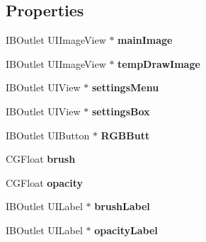 \subsection*{Properties}
\begin{DoxyCompactItemize}
\item 
\hypertarget{interface_draw_view_controller_ab6e98cda7ec75937c828a67591a1ed9c}{I\-B\-Outlet U\-I\-Image\-View $\ast$ {\bfseries main\-Image}}\label{interface_draw_view_controller_ab6e98cda7ec75937c828a67591a1ed9c}

\item 
\hypertarget{interface_draw_view_controller_a8d0bf1230597b17343797f0d998e7f25}{I\-B\-Outlet U\-I\-Image\-View $\ast$ {\bfseries temp\-Draw\-Image}}\label{interface_draw_view_controller_a8d0bf1230597b17343797f0d998e7f25}

\item 
\hypertarget{interface_draw_view_controller_a5d6a24c06d2078e27736d201076f61a4}{I\-B\-Outlet U\-I\-View $\ast$ {\bfseries settings\-Menu}}\label{interface_draw_view_controller_a5d6a24c06d2078e27736d201076f61a4}

\item 
\hypertarget{interface_draw_view_controller_af6a76a7906604ebf86e9e76488f05301}{I\-B\-Outlet U\-I\-View $\ast$ {\bfseries settings\-Box}}\label{interface_draw_view_controller_af6a76a7906604ebf86e9e76488f05301}

\item 
\hypertarget{interface_draw_view_controller_a4faa64d6fc92e03208f0dc111127f29d}{I\-B\-Outlet U\-I\-Button $\ast$ {\bfseries R\-G\-B\-Butt}}\label{interface_draw_view_controller_a4faa64d6fc92e03208f0dc111127f29d}

\item 
\hypertarget{interface_draw_view_controller_a439c6436002d7aae469bb57ef3093790}{C\-G\-Float {\bfseries brush}}\label{interface_draw_view_controller_a439c6436002d7aae469bb57ef3093790}

\item 
\hypertarget{interface_draw_view_controller_a0829a3ae82f879a957829c3e801a3c59}{C\-G\-Float {\bfseries opacity}}\label{interface_draw_view_controller_a0829a3ae82f879a957829c3e801a3c59}

\item 
\hypertarget{interface_draw_view_controller_a6c0bb851734498f562d02b5d2fa3656f}{I\-B\-Outlet U\-I\-Label $\ast$ {\bfseries brush\-Label}}\label{interface_draw_view_controller_a6c0bb851734498f562d02b5d2fa3656f}

\item 
\hypertarget{interface_draw_view_controller_a9faf1f7ca546ed3ce4b4b84478b2ea2b}{I\-B\-Outlet U\-I\-Label $\ast$ {\bfseries opacity\-Label}}\label{interface_draw_view_controller_a9faf1f7ca546ed3ce4b4b84478b2ea2b}


\end{DoxyCompactItemize}
